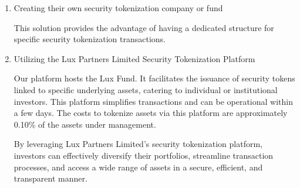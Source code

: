\documentclass[11pt]{article}
\begin{document}
\begin{enumerate}
  \item Creating their own security tokenization company or fund

This solution provides the advantage of having a dedicated structure for specific security tokenization transactions.

  \item Utilizing the Lux Partners Limited Security Tokenization Platform

Our platform hosts the Lux Fund. It facilitates the issuance of security tokens linked to specific underlying assets, catering to individual or institutional investors. This platform simplifies transactions and can be operational within a few days. The costs to tokenize assets via this platform are approximately 0.10\% of the assets under management.


By leveraging Lux Partners Limited's security tokenization platform, investors can effectively diversify their portfolios, streamline transaction processes, and access a wide range of assets in a secure, efficient, and transparent manner.

\end{enumerate}
\end{document}
